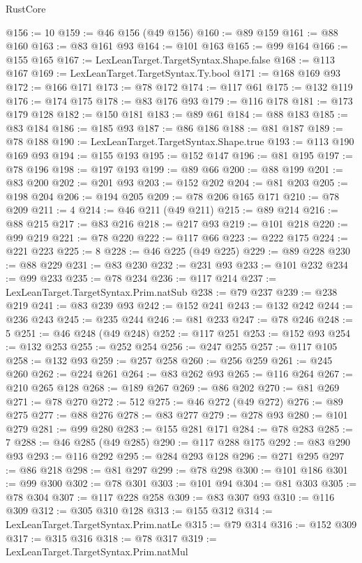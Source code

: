 \begin{lexlean}{RustCore}
\begin{coremodule}
@156 := 10
@159 := @46 @156 (@49 @156)
@160 := @89 @159
@161 := @88 @160
@163 := @83 @161 @93
@164 := @101 @163
@165 := @99 @164
@166 := @155 @165
@167 := LexLeanTarget.TargetSyntax.Shape.false
@168 := @113 @167
@169 := LexLeanTarget.TargetSyntax.Ty.bool
@171 := @168 @169 @93
@172 := @166 @171
@173 := @78 @172
@174 := @117 @61
@175 := @132 @119
@176 := @174 @175
@178 := @83 @176 @93
@179 := @116 @178
@181 := @173 @179 @128
@182 := @150 @181
@183 := @89 @61
@184 := @88 @183
@185 := @83 @184
@186 := @185 @93
@187 := @86 @186
@188 := @81 @187
@189 := @78 @188
@190 := LexLeanTarget.TargetSyntax.Shape.true
@193 := @113 @190 @169 @93
@194 := @155 @193
@195 := @152 @147
@196 := @81 @195
@197 := @78 @196
@198 := @197 @193
@199 := @89 @66
@200 := @88 @199
@201 := @83 @200
@202 := @201 @93
@203 := @152 @202
@204 := @81 @203
@205 := @198 @204
@206 := @194 @205
@209 := @78 @206 @165 @171
@210 := @78 @209
@211 := 4
@214 := @46 @211 (@49 @211)
@215 := @89 @214
@216 := @88 @215
@217 := @83 @216
@218 := @217 @93
@219 := @101 @218
@220 := @99 @219
@221 := @78 @220
@222 := @117 @66
@223 := @222 @175
@224 := @221 @223
@225 := 8
@228 := @46 @225 (@49 @225)
@229 := @89 @228
@230 := @88 @229
@231 := @83 @230
@232 := @231 @93
@233 := @101 @232
@234 := @99 @233
@235 := @78 @234
@236 := @117 @214
@237 := LexLeanTarget.TargetSyntax.Prim.natSub
@238 := @79 @237
@239 := @238 @219
@241 := @83 @239 @93
@242 := @152 @241
@243 := @132 @242
@244 := @236 @243
@245 := @235 @244
@246 := @81 @233
@247 := @78 @246
@248 := 5
@251 := @46 @248 (@49 @248)
@252 := @117 @251
@253 := @152 @93
@254 := @132 @253
@255 := @252 @254
@256 := @247 @255
@257 := @117 @105
@258 := @132 @93
@259 := @257 @258
@260 := @256 @259
@261 := @245 @260
@262 := @224 @261
@264 := @83 @262 @93
@265 := @116 @264
@267 := @210 @265 @128
@268 := @189 @267
@269 := @86 @202
@270 := @81 @269
@271 := @78 @270
@272 := 512
@275 := @46 @272 (@49 @272)
@276 := @89 @275
@277 := @88 @276
@278 := @83 @277
@279 := @278 @93
@280 := @101 @279
@281 := @99 @280
@283 := @155 @281 @171
@284 := @78 @283
@285 := 7
@288 := @46 @285 (@49 @285)
@290 := @117 @288 @175
@292 := @83 @290 @93
@293 := @116 @292
@295 := @284 @293 @128
@296 := @271 @295
@297 := @86 @218
@298 := @81 @297
@299 := @78 @298
@300 := @101 @186
@301 := @99 @300
@302 := @78 @301
@303 := @101 @94
@304 := @81 @303
@305 := @78 @304
@307 := @117 @228 @258
@309 := @83 @307 @93
@310 := @116 @309
@312 := @305 @310 @128
@313 := @155 @312
@314 := LexLeanTarget.TargetSyntax.Prim.natLe
@315 := @79 @314
@316 := @152 @309
@317 := @315 @316
@318 := @78 @317
@319 := LexLeanTarget.TargetSyntax.Prim.natMul

\end{coremodule}
\end{lexlean}
